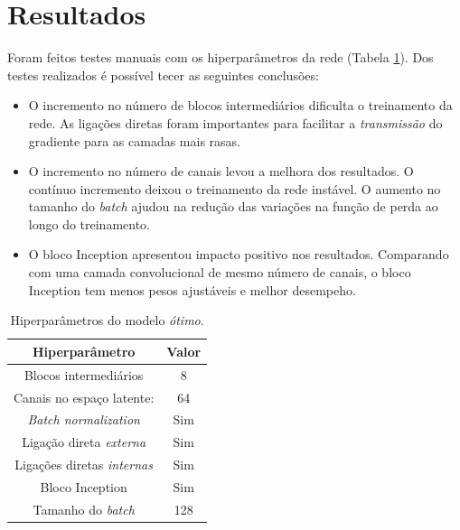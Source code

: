 \documentclass[final,5p]{elsarticle}
\numberwithin{equation}{section}
\begin{document}
\section{Resultados}

    Foram feitos testes manuais com os hiperparâmetros da rede (Tabela \ref{tab:hiperparam}). Dos testes realizados é possível tecer as seguintes conclusões:

    \begin{itemize}
        \item O incremento no número de blocos intermediários dificulta o treinamento da rede. As ligações diretas foram importantes para facilitar a \emph{transmissão} do gradiente para as camadas mais rasas.
        \item O incremento no número de canais levou a melhora dos resultados. O contínuo incremento deixou o treinamento da rede instável. O aumento no tamanho do \emph{batch} ajudou na redução das variações na função de perda ao longo do treinamento.
        \item O bloco Inception apresentou impacto positivo nos resultados. Comparando com uma camada convolucional de mesmo número de canais, o bloco Inception tem menos pesos ajustáveis e melhor desempeho.
    \end{itemize}

    \begin{table}
    \begin{center}
        \caption{Hiperparâmetros do modelo \emph{ótimo}.}
        \label{tab:hiperparam}
        \vspace{5pt}
        \begin{tabular}{c c}
            \toprule
            \textbf{Hiperparâmetro} & \textbf{Valor} \\
            \midrule
            Blocos intermediários & 8 \\
            Canais no espaço latente: & 64 \\
            \emph{Batch normalization} & Sim \\
            Ligação direta \emph{externa} & Sim \\
            Ligações diretas \emph{internas} & Sim \\
            Bloco Inception & Sim \\
            Tamanho do \emph{batch} & 128 \\
            \bottomrule
        \end{tabular}
    \end{center}
    \end{table}
\end{document}
